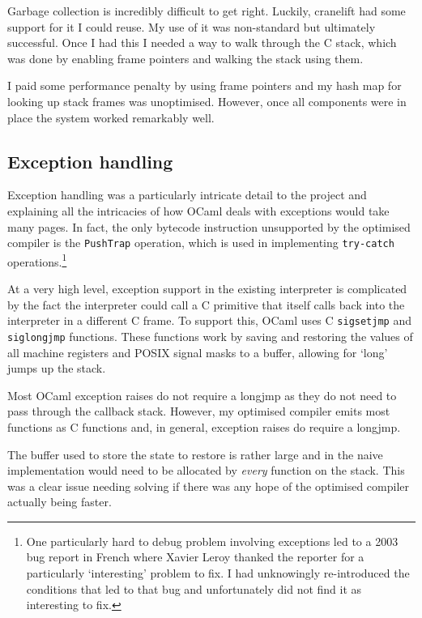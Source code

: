 Garbage collection is incredibly difficult to get right. Luckily, cranelift had some support for it
I could reuse. My use of it was non-standard but ultimately successful. Once I had this I needed a
way to walk through the C stack, which was done by enabling frame pointers and walking the stack
using them.

I paid some performance penalty by using frame pointers and my hash map for looking up stack frames
was unoptimised. However, once all components were in place the system worked remarkably well.

\subsection{Exception handling} \label{exception-handling}

Exception handling was a particularly intricate detail to the project and explaining all the
intricacies of how OCaml deals with exceptions would take many pages. In fact, the only bytecode
instruction unsupported by the optimised compiler is the \texttt{PushTrap} operation, which is used
in implementing \texttt{try-catch} operations.\footnote{
      One particularly hard to debug problem involving exceptions led to a 2003 bug report in
      French where Xavier Leroy thanked the reporter for a particularly `interesting' problem to
      fix. I
      had unknowingly re-introduced the conditions that led to that bug and unfortunately did not
      find it
      as interesting to fix.}

At a very high level, exception support in the existing interpreter is complicated by the fact the
interpreter could call a C primitive that itself calls back into the interpreter in a different C
frame. To support this, OCaml uses C \texttt{sigsetjmp} and \texttt{siglongjmp} functions. These
functions work by saving and restoring the values of all machine registers and POSIX signal masks
to a buffer, allowing for `long' jumps up the stack.

Most OCaml exception raises do not require a longjmp as they do not need to pass through
the callback stack. However, my optimised compiler emits most functions as C functions and, in
general, exception raises do require a longjmp.

The buffer used to store the state to restore is rather large and in the naive implementation would
need to be allocated by \emph{every} function on the stack. This was a clear issue needing solving
if there was any hope of the optimised compiler actually being faster.

